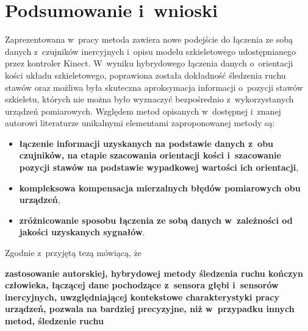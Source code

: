 \chapter{Podsumowanie i~wnioski }\label{chap:finalSummary}

Zaprezentowana w~pracy metoda zawiera nowe podejście do łączenia ze sobą danych z~czujników inercyjnych i~opisu modelu szkieletowego udostępnianego przez kontroler Kinect. W~wyniku hybrydowego łączenia danych o~orientacji kości układu szkieletowego, poprawiona została dokładność śledzenia ruchu stawów oraz możliwa była skuteczna aproksymacja informacji o~pozycji stawów szkieletu, których nie można było wyznaczyć bezpośrednio z~wykorzystanych urządzeń pomiarowych. Względem metod opisanych w~dostępnej i~znanej autorowi literaturze unikalnymi elementami zaproponowanej metody są:
\begin{itemize}
	\item \textbf{łączenie informacji uzyskanych na podstawie danych z~obu czujników, na etapie szacowania orientacji kości i~szacowanie pozycji stawów na podstawie wypadkowej wartości ich orientacji},\\
	\item \textbf{kompleksowa kompensacja mierzalnych błędów pomiarowych obu urządzeń}, \\
	\item \textbf{zróżnicowanie sposobu łączenia ze sobą danych w~zależności od jakości uzyskanych sygnałów}.
\end{itemize}


Zgodnie z~przyjętą tezą mówiącą, że

\textbf{zastosowanie autorskiej, hybrydowej metody śledzenia ruchu kończyn człowieka, łączącej dane pochodzące z~sensora głębi i~sensorów inercyjnych, uwzględniającej kontekstowe charakterystyki pracy urządzeń, pozwala na bardziej precyzyjne, niż w~przypadku innych metod, śledzenie ruchu}

